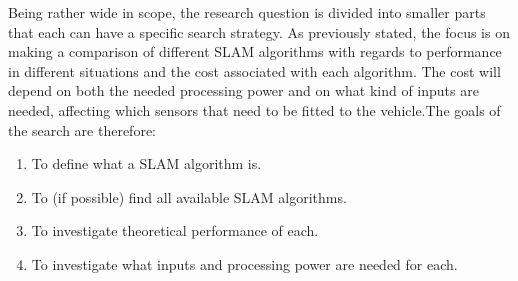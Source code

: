 Being rather wide in scope, the research question is divided into smaller parts
that each can have a specific search strategy. As previously stated, the focus
is on making a comparison of different SLAM algorithms with regards to
performance in different situations and the cost associated with each algorithm.
The cost will depend on both the needed processing power and on what kind of
inputs are needed, affecting which sensors that need to be fitted to the
vehicle.The goals of the search are therefore:
\begin{enumerate}
    \item To define what a SLAM algorithm is.
    \item To (if possible) find all available SLAM algorithms.
    \item To investigate theoretical performance of each.
    \item To investigate what inputs and processing power are needed for each.
\end{enumerate}

